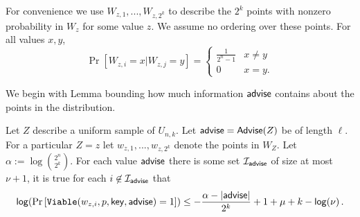 For convenience we use $W_{z, 1},..., W_{z,2^k}$ to describe the $2^k$ points with nonzero probability in $W_z$ for some value $z$.  We assume no ordering over these points.  For all values $x, y$, 
\[
\Pr[W_{z, i} =x | W_{z, j} = y] = \begin{cases} \frac{1}{2^n-1} &x\neq y\\0&x=y.\end{cases}
\]

We begin with Lemma bounding how much information ${\mathsf{advise}}$ contains about the points in the distribution.
\begin{lemma}
Let $Z$ describe a uniform sample of $U_{n,k}$.  Let ${\mathsf{advise}} = {\mathsf{Advise}}(Z)$ be of length $\ell$.
 For a particular $Z=z$ let $w_{z,1},..., w_{z,2^k}$ denote the points in $W_Z$. Let $\alpha:= \log {2^n\choose 2^k}$.  
For each value ${\mathsf{advise}}$ there is some set $\mathcal{I}_{{\mathsf{advise}}}$ of size at most $\nu+1$, it is true for each $i\not \in \mathcal{I}_{\mathsf{advise}}$ that
\[
\mathsf{log}\!\left(\Pr\left[\mathtt{Viable}(w_{z,i}, p, \mathsf{key}, {\mathsf{advise}}) = 1 \right]\right)\le -\frac{\alpha -|{\mathsf{advise}}| }{2^k}+1+\mu+k-\mathsf{log}\!\left(\nu\right).
\]
\label{lem:entr of members}
\end{lemma}

